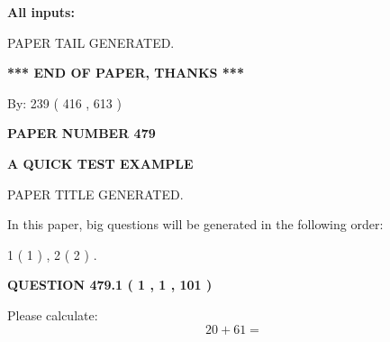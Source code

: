 \documentclass[12pt]{article}
\begin{document}
   
\noindent{}
   
   
   
   
\noindent\vspace{0.1in}\hspace{-0.08in} {\textbf{\Large{All inputs: }}}
   
   
   
   
   
   
 \vspace{0.2in}
 
   
   
\vspace{2.0in} PAPER TAIL GENERATED.
   
   
   
   
\vspace{1.0in} 
{\textbf{\large{ *** END OF PAPER, THANKS *** }}} 
   
   
\hspace{1.0in} By: 
 239 ( 416 ,  613 )
   
   
   
   
\newpage 
\setcounter{page}{ 
   479001 } 
   
   
   
   
 {\textbf{ \Large{ PAPER NUMBER  479  }}}
   
   
\vspace{0.2in}
   
   
   
   
   
   
   
   
 \vspace{0.2in}
{\LARGE {\textbf{ A QUICK TEST EXAMPLE}}}
   
   
 PAPER TITLE GENERATED.
   
   
   
\vspace{0.2in}
   
In this paper, big questions will be generated in the following order: 
   
   
   1 ( 1 )
 ,
   2 ( 2 )
 .
  
\vspace{0.2in}
  
{\textbf{\Large{QUESTION
479.1 
 ( 1 , 1 , 101 )
}}}
  
  
 
Please calculate:
\begin{equation}
20 +  %
61 = \nonumber
\end{equation}
 
\end{document}
